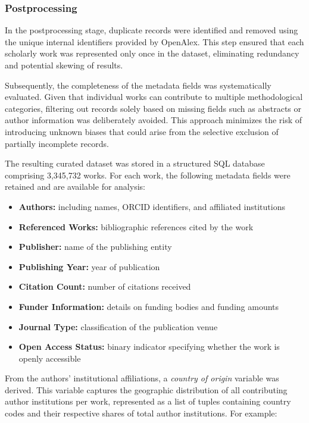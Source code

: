 \documentclass{article}
\begin{document}
\subsubsection{Postprocessing}


In the postprocessing stage, duplicate records were identified and removed using the unique internal identifiers provided by OpenAlex. This step ensured that each scholarly work was represented only once in the dataset, eliminating redundancy and potential skewing of results.

Subsequently, the completeness of the metadata fields was systematically evaluated. Given that individual works can contribute to multiple methodological categories, filtering out records solely based on missing fields such as abstracts or author information was deliberately avoided. This approach minimizes the risk of introducing unknown biases that could arise from the selective exclusion of partially incomplete records.

The resulting curated dataset was stored in a structured SQL database comprising 3,345,732 works. For each work, the following metadata fields were retained and are available for analysis:

\begin{itemize}
	\item \textbf{Authors:} including names, ORCID identifiers, and affiliated institutions
	\item \textbf{Referenced Works:} bibliographic references cited by the work
	\item \textbf{Publisher:} name of the publishing entity
	\item \textbf{Publishing Year:} year of publication
	\item \textbf{Citation Count:} number of citations received
	\item \textbf{Funder Information:} details on funding bodies and funding amounts
	\item \textbf{Journal Type:} classification of the publication venue
	\item \textbf{Open Access Status:} binary indicator specifying whether the work is openly accessible
\end{itemize}

From the authors' institutional affiliations, a \textit{country of origin} variable was derived. This variable captures the geographic distribution of all contributing author institutions per work, represented as a list of tuples containing country codes and their respective shares of total author institutions. For example:
\end{document}
